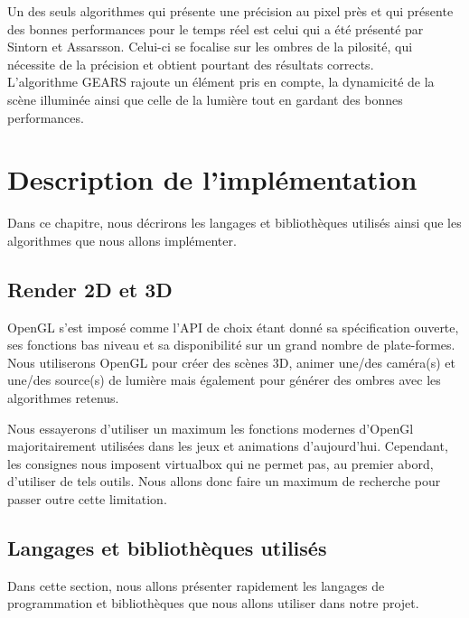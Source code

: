 \documentclass[a4paper,10pt]{report}
\begin{document}
Un des seuls algorithmes qui présente une précision au pixel près et qui présente des bonnes performances pour le temps réel est celui qui a été présenté par Sintorn et Assarsson\cite{sintorn2009hair}. Celui-ci se focalise sur les ombres de la pilosité, qui nécessite de la précision et obtient pourtant des résultats corrects.
\\

L'algorithme GEARS\cite{wang2014gears} rajoute un élément pris en compte, la dynamicité de la scène illuminée ainsi que celle de la lumière tout en gardant des bonnes performances.\todo{}


\chapter{Description de l’implémentation}

Dans ce chapitre, nous décrirons les langages et bibliothèques utilisés ainsi que les algorithmes que nous allons implémenter.

\section{Render 2D et 3D}
OpenGL s'est imposé comme l'API de choix étant donné sa spécification ouverte, ses fonctions bas niveau et sa disponibilité sur un grand nombre de plate-formes.
Nous utiliserons OpenGL pour créer des scènes 3D, animer une/des caméra(s) et une/des source(s) de lumière mais également pour générer des ombres avec les algorithmes retenus.

Nous essayerons d'utiliser un maximum les fonctions modernes d'OpenGl majoritairement utilisées dans les jeux et animations d'aujourd'hui. Cependant, les consignes nous imposent virtualbox qui ne permet pas, au premier abord, d'utiliser de tels outils. Nous allons donc faire un maximum de recherche pour passer outre cette limitation.

\section{Langages et bibliothèques utilisés}

Dans cette section, nous allons présenter rapidement les langages de programmation et bibliothèques que nous allons utiliser dans notre projet.
\end{document}

